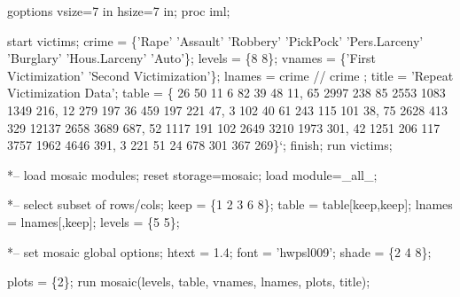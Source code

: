 \begin{listing}
goptions vsize=7 in hsize=7 in;
proc iml;
 
start victims;
   crime = \{'Rape' 'Assault' 'Robbery' 'PickPock' 'Pers.Larceny'
            'Burglary' 'Hous.Larceny' 'Auto'\};
   levels = \{8 8\};
   vnames = \{'First Victimization' 'Second Victimization'\};
   lnames = crime // crime ;
   title  = 'Repeat Victimization Data';
   table = \{  26   50  11   6    82   39   48   11,
              65 2997 238  85  2553 1083 1349  216,
              12  279 197  36   459  197  221   47,
               3  102  40  61   243  115  101   38,
              75 2628 413 329 12137 2658 3689  687,
              52 1117 191 102  2649 3210 1973  301,
              42 1251 206 117  3757 1962 4646  391,
               3  221  51  24   678  301  367  269\}`;
   finish;
   run victims;

   *-- load mosaic modules;
   reset storage=mosaic;
   load module=_all_;
 
   *-- select subset of rows/cols;
   keep = \{1 2 3 6 8\};
   table = table[keep,keep];
   lnames = lnames[,keep];
   levels = \{5 5\};

   *-- set mosaic global options;
   htext = 1.4;
   font = 'hwpsl009';
   shade = \{2 4 8\};

   plots = \{2\};
   run mosaic(levels, table, vnames, lnames, plots, title);
 
\end{listing}
